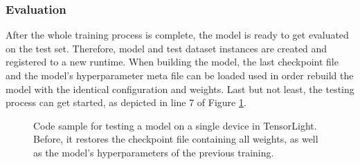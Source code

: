 \subsubsection*{Evaluation}

After the whole training process is complete, the model is ready to get evaluated on the test set. Therefore, model and test dataset instances are created and registered to a new runtime. When building the model, the last checkpoint file and the model's hyperparameter meta file can be loaded used in order rebuild the model with the identical configuration and weights. Last but not least, the testing process can get started, as depicted in line 7 of Figure \ref{code:runtime_eval}.

\begin{figure}[htpb]
  
  \caption[Code: Evaluation with TensorLight]{Code sample for testing a model on a single device in TensorLight. Before, it restores the checkpoint file containing all weights, as well as the model's hyperparameters of the previous training.}\label{code:runtime_eval}
\end{figure}